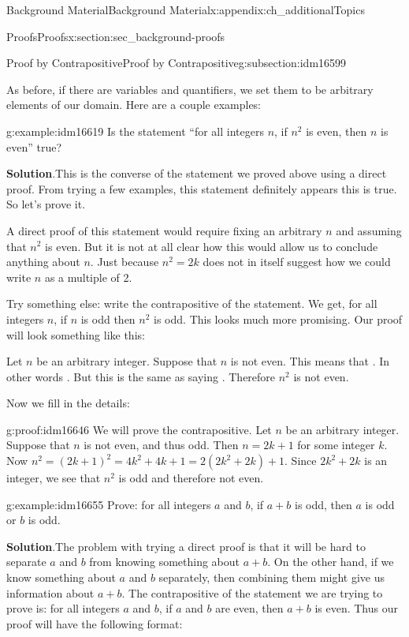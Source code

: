 \documentclass[oneside,10pt,]{book}
\numberwithin{equation}{chapter}
\begin{document}
\begin{appendixptx}{Background Material}{}{Background Material}{}{}{x:appendix:ch_additionalTopics}
\begin{sectionptx}{Proofs}{}{Proofs}{}{}{x:section:sec_background-proofs}
\begin{subsectionptx}{Proof by Contrapositive}{}{Proof by Contrapositive}{}{}{g:subsection:idm16599}
\begin{quote}
\end{quote}
As before, if there are variables and quantifiers, we set them to be arbitrary elements of our domain. Here are a couple examples:%
\begin{example}{}{g:example:idm16619}%
Is the statement ``for all integers \(n\), if \(n^2\) is even, then \(n\) is even'' true?%
\par\smallskip%
\noindent\textbf{Solution}.\hypertarget{g:solution:idm16626}{}\quad{}This is the converse of the statement we proved above using a direct proof. From trying a few examples, this statement definitely appears this is true. So let's prove it.%
\par
A direct proof of this statement would require fixing an arbitrary \(n\) and assuming that \(n^2\) is even. But it is not at all clear how this would allow us to conclude anything about \(n\). Just because \(n^2 = 2k\) does not in itself suggest how we could write \(n\) as a multiple of 2.%
\par
Try something else: write the contrapositive of the statement. We get, for all integers \(n\), if \(n\) is odd then \(n^2\) is odd. This looks much more promising. Our proof will look something like this:%
\par
Let \(n\) be an arbitrary integer. Suppose that \(n\) is not even. This means that \textellipsis{}. In other words \textellipsis{}. But this is the same as saying \textellipsis{}. Therefore \(n^2\) is not even.%
\par
Now we fill in the details:%
\begin{proofptx}{}{g:proof:idm16646}
We will prove the contrapositive. Let \(n\) be an arbitrary integer. Suppose that \(n\) is not even, and thus odd. Then \(n= 2k+1\) for some integer \(k\). Now \(n^2 = (2k+1)^2 = 4k^2 + 4k + 1 = 2(2k^2 + 2k) + 1\). Since \(2k^2 + 2k\) is an integer, we see that \(n^2\) is odd and therefore not even.%
\end{proofptx}
\end{example}
\begin{example}{}{g:example:idm16655}%
Prove: for all integers \(a\) and \(b\), if \(a + b\) is odd, then \(a\) is odd or \(b\) is odd.%
\par\smallskip%
\noindent\textbf{Solution}.\hypertarget{g:solution:idm16663}{}\quad{}The problem with trying a direct proof is that it will be hard to separate \(a\) and \(b\) from knowing something about \(a+b\). On the other hand, if we know something about \(a\) and \(b\) separately, then combining them might give us information about \(a+b\). The contrapositive of the statement we are trying to prove is: for all integers \(a\) and \(b\), if \(a\) and \(b\) are even, then \(a+b\) is even. Thus our proof will have the following format:%

\end{example}
\end{subsectionptx}
\end{sectionptx}
\end{appendixptx}
\end{document}
